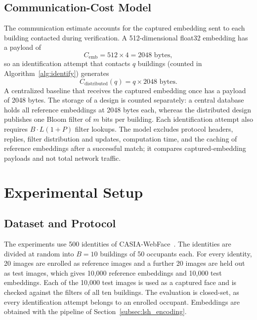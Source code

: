 \documentclass[pdflatex,sn-mathphys-num]{sn-jnl}%
\theoremstyle{thmstyleone}%
\theoremstyle{thmstyletwo}%
\theoremstyle{thmstylethree}%
\begin{document}
\subsection{Communication-Cost Model}
\label{subsec:communication_cost}

The communication estimate accounts for the captured embedding sent to each building contacted during verification. A 512-dimensional float32 embedding has a payload of
\begin{equation}
    C_{\mathrm{emb}} = 512 \times 4 = 2048 \text{ bytes},
    \label{eq:embedding_bytes}
\end{equation}
so an identification attempt that contacts $q$ buildings (counted in Algorithm~\ref{alg:identify}) generates
\begin{equation}
    C_{\mathrm{distributed}}(q) = q \times 2048 \text{ bytes}.
    \label{eq:distributed_communication}
\end{equation}
A centralized baseline that receives the captured embedding once has a payload of 2048 bytes. The storage of a design is counted separately: a central database holds all reference embeddings at 2048 bytes each, whereas the distributed design publishes one Bloom filter of $m$ bits per building. Each identification attempt also requires $B\cdot L(1+P)$ filter lookups. The model excludes protocol headers, replies, filter distribution and updates, computation time, and the caching of reference embeddings after a successful match; it compares captured-embedding payloads and not total network traffic.


\section{Experimental Setup}
\label{sec:setup}

\subsection{Dataset and Protocol}

The experiments use 500 identities of CASIA-WebFace~\cite{yi2014}. The identities are divided at random into $B=10$ buildings of 50 occupants each. For every identity, 20 images are enrolled as reference images and a further 20 images are held out as test images, which gives 10,000 reference embeddings and 10,000 test embeddings. Each of the 10,000 test images is used as a captured face and is checked against the filters of all ten buildings. The evaluation is closed-set, as every identification attempt belongs to an enrolled occupant. Embeddings are obtained with the pipeline of Section~\ref{subsec:lsh_encoding}.
\end{document}
